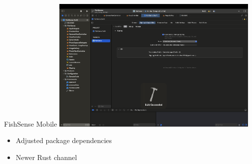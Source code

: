 


\begin{frame}{FishSense Mobile}
    \centering
    \includegraphics[height=0.75\textheight,width=0.75\textwidth,keepaspectratio]{images/fishsense_enduser/fsmobileBuildSuccess.png}
    \begin{itemize}
        \item Adjusted package dependencies
        \item Newer Rust channel
    \end{itemize}
\end{frame}


